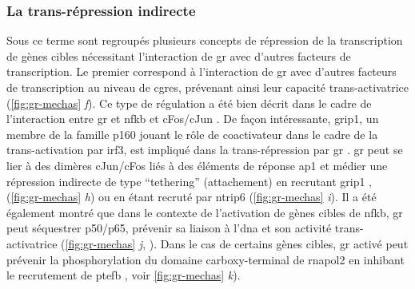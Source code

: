 \documentclass[../main.tex]{subfiles}
\begin{document}
\subsubsection{La trans-répression indirecte}
Sous ce terme sont regroupés plusieurs concepts de répression de la transcription de gènes cibles nécessitant l'interaction de \gls{gr} avec d'autres facteurs de transcription.
Le premier correspond à l'interaction de \gls{gr} avec d'autres facteurs de transcription au niveau de \glspl{cgre}, prévenant ainsi leur capacité trans-activatrice (\autoref{fig:gr-mechas} \textit{f}).
Ce type de régulation a été bien décrit dans le cadre de l'interaction entre \gls{gr} et \gls{nfkb} \citep{Ray1994} et cFos/cJun \citep{Pearce1993}.
De façon intéressante, \gls{grip1}, un membre de la famille p160 jouant le rôle de coactivateur dans le cadre de la trans-activation par \gls{irf3}, est impliqué dans la trans-répression par \gls{gr} \citep{Reily2006}.
\gls{gr} peut se lier à des dimères cJun/cFos liés à des éléments de réponse \gls{ap1} et médier une répression indirecte de type ``tethering'' (attachement) en recrutant \gls{grip1} \citep{Rogatsky2002}, (\autoref{fig:gr-mechas} \textit{h}) ou en étant recruté par \gls{ntrip6} (\autoref{fig:gr-mechas} \textit{i}).
Il a été également montré que dans le contexte de l'activation de gènes cibles de \gls{nfkb}, \gls{gr} peut séquestrer p50/p65, prévenir sa liaison à l'\gls{dna} et son activité trans-activatrice (\autoref{fig:gr-mechas} \textit{j}, \citet{Mukaida1994,DeBosscher2003}).
Dans le cas de certains gènes cibles, \gls{gr} activé peut prévenir la phosphorylation du domaine carboxy-terminal de \gls{rnapol2} \citep{Nissen2000} en inhibant le recrutement de \gls{ptefb} \citep{Luecke2005}, voir \autoref{fig:gr-mechas} \textit{k}).
\end{document}
